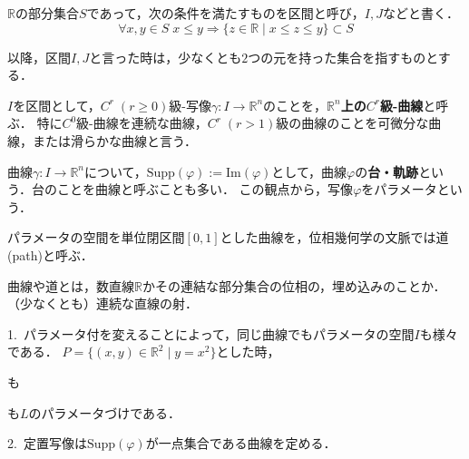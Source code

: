 \documentclass[uplatex, 12pt, dvipdfmx]{jsarticle}
\begin{document}
\begin{definition}[区間]
    $\mathbb{R}$の部分集合$S$であって，次の条件を満たすものを区間と呼び，$I,J$などと書く．
    \[ \forall x,y\in S\; x\le y\Rightarrow \{ z\in\mathbb{R}\mid x\le z\le y \}\subset S \]
\end{definition}
以降，区間$I,J$と言った時は，少なくとも$2$つの元を持った集合を指すものとする．

\begin{definition}[曲線]\label{def-curve}
    $I$を区間として，$C^r\;(r\ge 0)$級-写像$\gamma:I\to\mathbb{R}^n$のことを，\textbf{$\mathbb{R}^n$上の$C^r$級-曲線}と呼ぶ．
    特に$C^0$級-曲線を連続な曲線，$C^r\;(r>1)$級の曲線のことを可微分な曲線，または滑らかな曲線と言う．
\end{definition}
\begin{remark}[台，パラメータ]
    曲線$\gamma:I\to\mathbb{R}^n$について，$\mathrm{Supp}(\varphi):=\mathrm{Im}(\varphi)$として，曲線$\varphi$の\textbf{台・軌跡}という．台のことを曲線と呼ぶことも多い．
    この観点から，写像$\varphi$をパラメータという．

    パラメータの空間を単位閉区間$[0,1]$とした曲線を，位相幾何学の文脈では道(path)と呼ぶ．

    曲線や道とは，数直線$\mathbb{R}$かその連結な部分集合の位相の，埋め込みのことか．（少なくとも）連続な直線の射．
\end{remark}

\begin{example}\rm{}\label{examples-various-curves}
    1.\, パラメータ付を変えることによって，同じ曲線でもパラメータの空間$I$も様々である．
    $P=\{(x,y)\in\mathbb{R}^2\mid y=x^2\}$とした時，
    \begin{center}\end{center}
    も
    \begin{center}\end{center}
    も$L$のパラメータづけである．

    2.\, 定置写像は$\mathrm{Supp}(\varphi)$が一点集合である曲線を定める．
\end{example}
\end{document}

